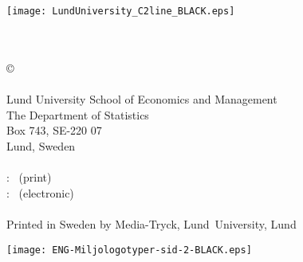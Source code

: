 


\cleardoublepage
\thispagestyle{empty} %
~
\vspace*{0.80cm}
\begin{center}
  {\Huge \myMainTitle}
  \\[2mm]
  {\Large \mySubTitle}

  \vspace*{6ex}

  {\Large\myName}

  \vspace*{6ex}
  \texttt{[image: LundUniversity\_C2line\_BLACK.eps]}
\end{center}
\vfill


\newpage

\thispagestyle{empty} %

\null

\vfill

{\small
  \myCoverFront
  \\
  \\
  \noindent\copyright\, \myName~\myYear
  \\
  \\
  Lund University School of Economics and Management\\
  The Department of Statistics\\
  Box 743, SE-220 07\\
  Lund, Sweden
  \\
  \\
  \ISBN: \myISBNprint~(print)
  \\
  \ISBN: \myISBNpdf~(electronic)
  \\
  \\
  Printed in Sweden by Media-Tryck, Lund~University, Lund~\myYear

  \bigskip

  \noindent\texttt{[image: ENG-Miljologotyper-sid-2-BLACK.eps]}
}
